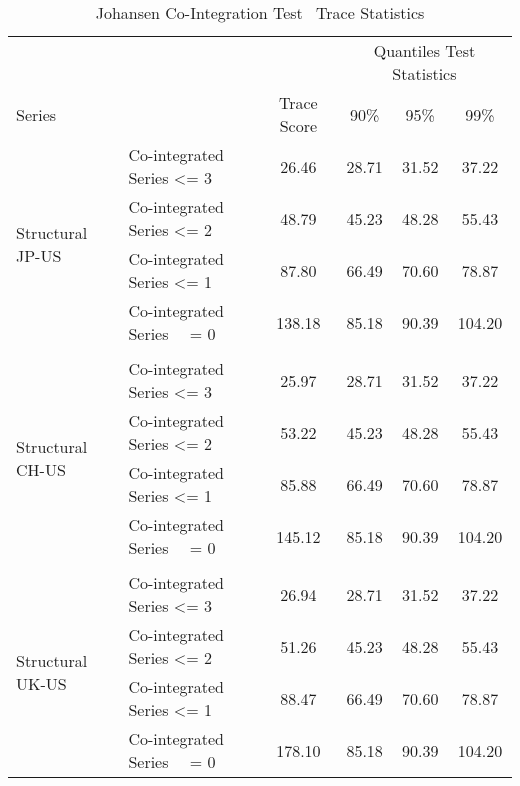 \begin{table}[!h] %
  \centering
    \caption[Co-integration Test]{Johansen Co-Integration Test \textendash \ Trace Statistics}
  \begin{tabular}{llcccc} %
    \toprule
                                             &                                                 &               & \multicolumn{3}{c}{Quantiles Test Statistics}\\
    \cmidrule(r){1-6}
    Series                                   &                                                 & Trace Score   &  90\%     & 95\%     & 99\%\\
    \midrule
    \multirow{4}{*}{Structural JP-US}        & \multicolumn{1}{l}{Co-integrated Series <= 3}    & 26.46         & 28.71     & 31.52    & 37.22  \\
                                             & \multicolumn{1}{l}{Co-integrated Series <= 2}    & 48.79         & 45.23     & 48.28    & 55.43  \\ 
                                             & \multicolumn{1}{l}{Co-integrated Series <= 1}    & 87.80         & 66.49     & 70.60    & 78.87  \\
                                             & \multicolumn{1}{l}{Co-integrated Series \ \ = 0} & 138.18        & 85.18     & 90.39    & 104.20 \\
    \\
    \multirow{4}{*}{Structural CH-US}        & \multicolumn{1}{l}{Co-integrated Series <= 3}    & 25.97         & 28.71     & 31.52    & 37.22  \\
                                             & \multicolumn{1}{l}{Co-integrated Series <= 2}    & 53.22         & 45.23     & 48.28    & 55.43  \\ 
                                             & \multicolumn{1}{l}{Co-integrated Series <= 1}    & 85.88         & 66.49     & 70.60    & 78.87  \\
                                             & \multicolumn{1}{l}{Co-integrated Series \ \ = 0} & 145.12        & 85.18     & 90.39    & 104.20 \\
    \\
    \multirow{4}{*}{Structural UK-US}        & \multicolumn{1}{l}{Co-integrated Series <= 3}    & 26.94         & 28.71     & 31.52    & 37.22  \\
                                             & \multicolumn{1}{l}{Co-integrated Series <= 2}    & 51.26         & 45.23     & 48.28    & 55.43  \\ 
                                             & \multicolumn{1}{l}{Co-integrated Series <= 1}    & 88.47         & 66.49     & 70.60    & 78.87  \\
                                             & \multicolumn{1}{l}{Co-integrated Series \ \ = 0} & 178.10        & 85.18     & 90.39    & 104.20 \\
    \bottomrule
  \end{tabular}
\label{tab:Co-Integration}
\end{table}

